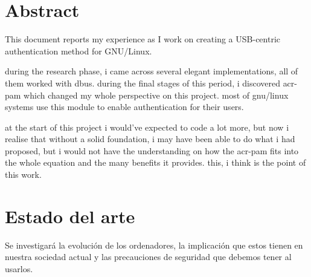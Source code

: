 \documentclass[titlepage, 12pt, a4paper]{article}
\begin{document}
\section*{Abstract}
This document reports my experience as I work on creating a USB-centric authentication method for \gls{GNU/Linux}. \par
during the research phase, i came across several elegant implementations, all of them worked with \gls{dbus}. during the final stages of this period, i discovered \gls{acr-pam} which changed my whole perspective on this project. most of \gls{gnu/linux} systems use this module to enable authentication for their users.\par
at the start of this project i would've expected to code a lot more, but now i realise that without a solid foundation, i may have been able to do what i had proposed, but i would not have the understanding on how the \gls{acr-pam} fits into the whole equation and the many benefits it provides. this, i think is the point of this work.
\clearpage

\tableofcontents
\clearpage
\listoffigures
\clearpage
{}
\section{Estado del arte}
Se investigará la evolución de los ordenadores, la implicación que estos tienen en nuestra sociedad actual y las precauciones de seguridad que debemos tener al usarlos.
\end{document}

